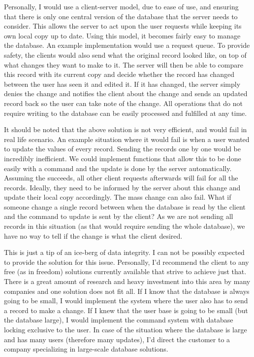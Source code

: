 \documentclass{report}
\begin{document}
Personally, I would use a client-server model, due to ease of use, and
ensuring that there is only one central version of the database that
the server needs to consider. This allows the server to act upon the
user requests while keeping its own local copy up to date. Using this
model, it becomes fairly easy to manage the database. An example
implementation would use a request queue. To provide safety, the
clients would also send what the original record looked like, on top
of what changes they want to make to it. The server will then be able
to compare this record with its current copy and decide whether the
record has changed between the user has seen it and edited it. If it
has changed, the server simply denies the change and notifies the
client about the change and sends an updated record back so the user
can take note of the change. All operations that do not require
writing to the database can be easily processed and fulfilled at any
time.

It should be noted that the above solution is not very efficient, and
would fail in real life scenario. An example situation where it would
fail is when a user wanted to update the values of every record.
Sending the records one by one would be incredibly inefficient. We
could implement functions that allow this to be done easily with a
command and the update is done by the server automatically. Assuming
the succeeds, all other client requests afterwards will fail for all
the records. Ideally, they need to be informed by the server about
this change and update their local copy accordingly. The mass change
can also fail. What if someone change a single record between when the
database is read by the client and the command to update is sent by
the client? As we are not sending all records in this situation (as
that would require sending the whole database), we have no way to tell
if the change is what the client desired.

This is just a tip of an ice-berg of data integrity. I can not be
possibly expected to provide the solution for this issue. Personally,
I'd recommend the client to any free (as in freedom) solutions
currently available that strive to achieve just that. There is a great
amount of research and heavy investment into this area by many
companies and one solution does not fit all. If I know that the
database is always going to be small, I would implement the system
where the user also has to send a record to make a change. If I knew
that the user base is going to be small (but the database large), I
would implement the command system with database locking exclusive to
the user. In case of the situation where the database is large and has
many users (therefore many updates), I'd direct the customer to a
company specializing in large-scale database solutions.
\end{document}
